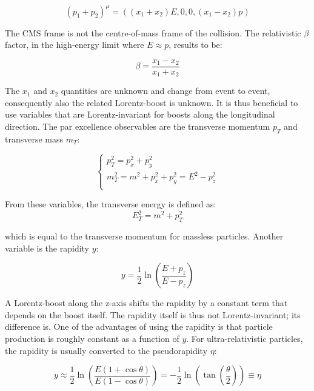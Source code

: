 \documentclass[11pt]{article}
\begin{document}
\begin{equation}
\label{eq:pmomenta}
(p_1 + p_2)^{\mu} = ((x_1 + x_2)E, 0, 0, (x_1 - x_2)p)
\end{equation}

The CMS frame is not the centre-of-mass frame of the collision.
The relativistic \(\beta\) factor, in the high-energy limit where \(E \approx p\), results to be:

\begin{equation}
\label{eq:beta}
\beta = \frac{x_1 - x_2}{x_1 + x_2}
\end{equation}

The \(x_1\) and \(x_2\) quantities are unknown and change from event to event, consequently also the related Lorentz-boost is unknown.
It is thus beneficial to use variables that are Lorentz-invariant for boosts along the longitudinal direction.
The par excellence observables are the transverse momentum \(p_T\) and transverse mass \(m_T\):

\begin{equation}
\label{eq:transverse_momenta}
\begin{cases}
p^2_T = p^2_x + p^2_y \\
m^2_T = m^2 + p^2_x + p^2_y = E^2 - p^2_z \\
\end{cases}
\end{equation}


From these variables, the transverse energy is defined as:
\begin{equation}
\label{eq:transverse energy}
E^2_T = m^2 + p^2_T
\end{equation}

which is equal to the transverse momentum for massless particles.
Another variable is the rapidity \(y\):

\begin{equation}
\label{eq:rapidity}
y = \frac{1}{2} \ln \left( \frac{E + p_z}{E - p_z} \right)
\end{equation}

A Lorentz-boost along the z-axis shifts the rapidity by a constant term that depends on the boost itself.
The rapidity itself is thus not Lorentz-invariant; its difference is.
One of the advantages of using the rapidity is that particle production is roughly constant as a function of \(y\).
For ultra-relativistic particles, the rapidity is usually converted to the pseudorapidity \(\eta\):


\begin{equation}
\label{eq:pseudo-rapidity}
y \approx \frac{1}{2} \ln \left( \frac{E(1 + \cos \theta)}{E(1 - \cos \theta)} \right)
= -\frac{1}{2} \ln \left( \tan \left( \frac{\theta}{2} \right) \right)
\equiv \eta
\end{equation}
\end{document}
